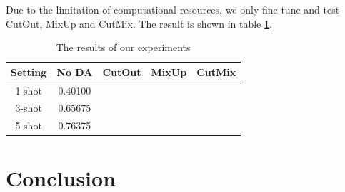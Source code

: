 \documentclass{article}
\begin{document}
Due to the limitation of computational resources, 
we only fine-tune and test CutOut, MixUp and CutMix. 
The result is shown in table \ref{tab:results}.

\begin{table}[h]
	\centering
	\caption{The results of our experiments}
	\begin{tabular}{ccccc}
		\toprule
		Setting & No DA & CutOut & MixUp & CutMix \\
		\midrule
		1-shot & 0.40100 &  &  &  \\
		3-shot & 0.65675 &  &  &  \\
		5-shot & 0.76375 &  &  &  \\
		\bottomrule
	\end{tabular}
	\label{tab:results}
\end{table}

\section{Conclusion}



\end{document}
